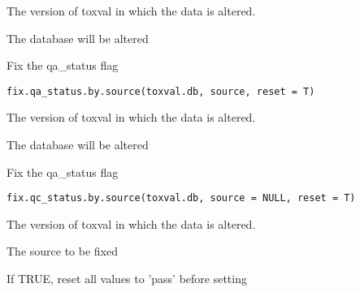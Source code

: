 \documentclass[letterpaper]{book}
\begin{document}
%
\begin{Arguments}
\begin{ldescription}
\item[\code{toxval.db}] The version of toxval in which the data is altered.
\end{ldescription}
\end{Arguments}
%
\begin{Value}
The database will be altered
\end{Value}
%
\begin{Description}\relax
Fix the qa\_status flag
\end{Description}
%
\begin{Usage}
\begin{verbatim}
fix.qa_status.by.source(toxval.db, source, reset = T)
\end{verbatim}
\end{Usage}
%
\begin{Arguments}
\begin{ldescription}
\item[\code{toxval.db}] The version of toxval in which the data is altered.
\end{ldescription}
\end{Arguments}
%
\begin{Value}
The database will be altered
\end{Value}
%
\begin{Description}\relax
Fix the qa\_status flag
\end{Description}
%
\begin{Usage}
\begin{verbatim}
fix.qc_status.by.source(toxval.db, source = NULL, reset = T)
\end{verbatim}
\end{Usage}
%
\begin{Arguments}
\begin{ldescription}
\item[\code{toxval.db}] The version of toxval in which the data is altered.

\item[\code{source}] The source to be fixed

\item[\code{reset}] If TRUE, reset all values to 'pass' before setting
\end{ldescription}
\end{Arguments}
\end{document}
